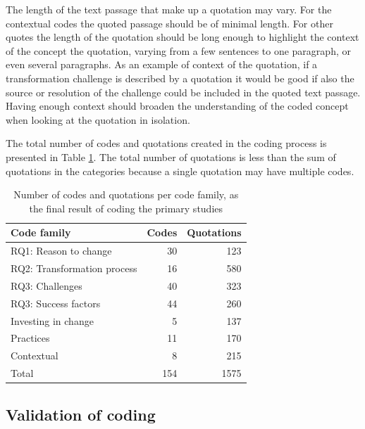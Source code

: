 The length of the text passage that make up a quotation may vary. For the
contextual codes the quoted passage should be of minimal length. For other
quotes the length of the quotation should be long enough to highlight the
context of the concept the quotation, varying from a few sentences to one
paragraph, or even several paragraphs. As an example of context of the
quotation, if a transformation challenge is described by a quotation it would be
good if also the source or resolution of the challenge could be included in the
quoted text passage. Having enough context should broaden the understanding
of the coded concept when looking at the quotation in isolation.


The total number of codes and quotations created in the coding process is
presented in Table \ref{table:codecount}. The total number of quotations is less
than the sum of quotations in the categories because a single quotation may have
multiple codes.

\begin{table}
    \centering
    \begin{tabular}{ l r r }
        \toprule
        Code family    &  Codes  &  Quotations
        \\
        \midrule
        RQ1: Reason to change &        30 &  123 \\
		RQ2: Transformation process &  16 &  580 \\
		RQ3: Challenges &              40 &  323 \\
		RQ3: Success factors &         44 &  260 \\
		Investing in change  &          5 &  137 \\
		Practices &                    11 &  170 \\
		Contextual &                    8 &  215 \\
		Total &                       154 & 1575 \\
        \bottomrule
    \end{tabular}
    \caption{Number of codes and quotations per code family, as the final result
    of coding the primary studies}
    \label{table:codecount}
\end{table}

\clearpage

\subsection{Validation of coding}

